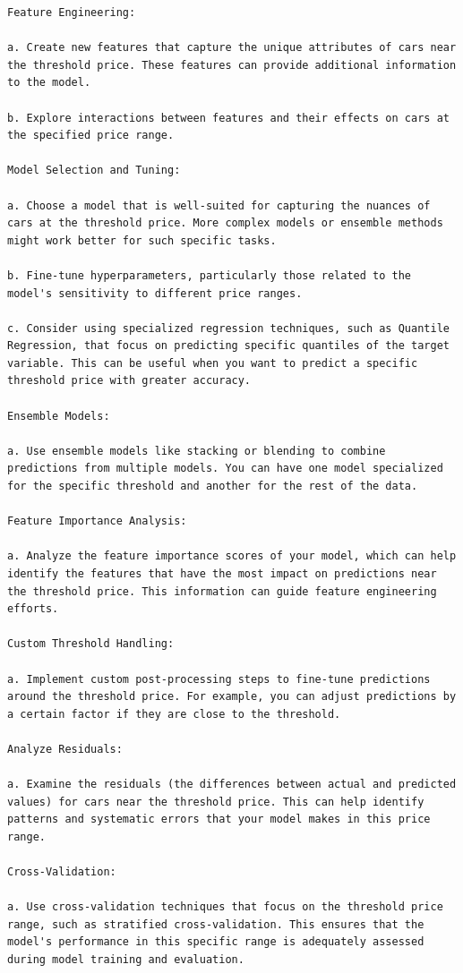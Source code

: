 \documentclass{article}
\begin{document}
\begin{titlepage}
\begin{verbatim}
Feature Engineering:

a. Create new features that capture the unique attributes of cars near the threshold price. These features can provide additional information to the model.

b. Explore interactions between features and their effects on cars at the specified price range.

Model Selection and Tuning:

a. Choose a model that is well-suited for capturing the nuances of cars at the threshold price. More complex models or ensemble methods might work better for such specific tasks.

b. Fine-tune hyperparameters, particularly those related to the model's sensitivity to different price ranges.

c. Consider using specialized regression techniques, such as Quantile Regression, that focus on predicting specific quantiles of the target variable. This can be useful when you want to predict a specific threshold price with greater accuracy.

Ensemble Models:

a. Use ensemble models like stacking or blending to combine predictions from multiple models. You can have one model specialized for the specific threshold and another for the rest of the data.

Feature Importance Analysis:

a. Analyze the feature importance scores of your model, which can help identify the features that have the most impact on predictions near the threshold price. This information can guide feature engineering efforts.

Custom Threshold Handling:

a. Implement custom post-processing steps to fine-tune predictions around the threshold price. For example, you can adjust predictions by a certain factor if they are close to the threshold.

Analyze Residuals:

a. Examine the residuals (the differences between actual and predicted values) for cars near the threshold price. This can help identify patterns and systematic errors that your model makes in this price range.

Cross-Validation:

a. Use cross-validation techniques that focus on the threshold price range, such as stratified cross-validation. This ensures that the model's performance in this specific range is adequately assessed during model training and evaluation.


\end{verbatim}
\end{titlepage}
\end{document}

